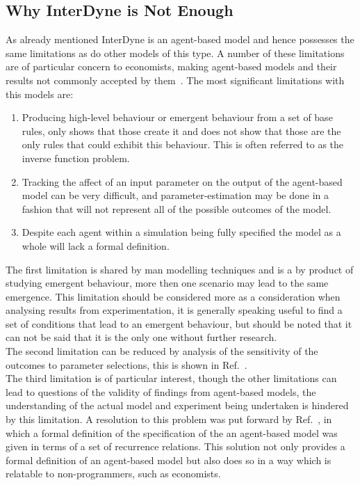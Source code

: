 \documentclass{article}
\begin{document}
\subsection{Why InterDyne is Not Enough}
As already mentioned InterDyne is an agent-based model and hence possesses the same limitations as do other models of this type. A number of these limitations are of particular concern to economists, making agent-based models and their results not commonly accepted by them~\cite{econmistsnoabm, lob_noecomimists}. The most significant limitations  with this models are:
 \begin{enumerate}
  \item Producing high-level behaviour or emergent behaviour from a set of base rules, only shows that those create it and does not show that those are the only rules that could exhibit this behaviour. This is often referred to as the inverse function problem.
  \item Tracking the affect of an input parameter on the output of the agent-based model can be very difficult, and parameter-estimation may be done in a fashion that will not represent all of the possible outcomes of the model. 
  \item Despite each agent within a simulation being fully specified the model as a whole will lack a formal definition. 
\end{enumerate}
The first limitation is shared by man modelling techniques and is a by product of studying emergent behaviour, more then one scenario may lead to the same emergence. This limitation should be considered more as a consideration when analysing results from experimentation, it is generally speaking useful to find a set of conditions that lead to an emergent behaviour, but should be noted that it can not be said that it is the only one without further research.\\
The second limitation can be reduced by analysis of the sensitivity of the outcomes to parameter selections, this is shown in Ref.~\cite{econmistsnoabm}.\\
The third limitation is of particular interest, though the other limitations can lead to questions of the validity of findings from agent-based models, the understanding of the actual model and experiment being undertaken is hindered by this limitation. A resolution to this problem was put forward by Ref.~\cite{econmistsnoabm}, in which a formal definition of the specification of the an agent-based model was given in terms of a set of recurrence relations. This solution not only provides a formal definition of an agent-based model but also does so in a way which is relatable to non-programmers, such as economists.     
\end{document}
